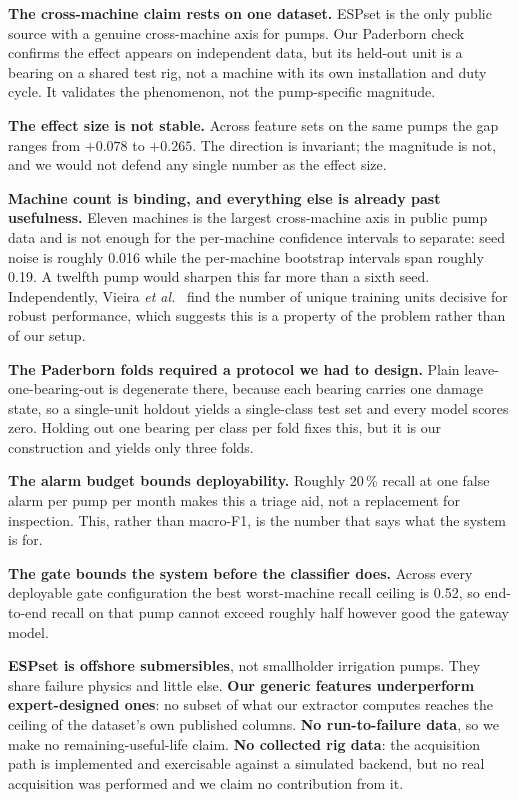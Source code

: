 \documentclass[conference,a4paper,10pt]{IEEEtran}
\begin{document}
\textbf{The cross-machine claim rests on one dataset.} ESPset is the only public
source with a genuine cross-machine axis for pumps. Our Paderborn check confirms
the effect appears on independent data, but its held-out unit is a bearing on a
shared test rig, not a machine with its own installation and duty cycle. It
validates the phenomenon, not the pump-specific magnitude.

\textbf{The effect size is not stable.} Across feature sets on the same pumps the
gap ranges from $+0.078$ to $+0.265$. The direction is invariant; the magnitude is
not, and we would not defend any single number as the effect size.

\textbf{Machine count is binding, and everything else is already past
usefulness.} Eleven machines is the largest cross-machine axis in public pump data
and is not enough for the per-machine confidence intervals to separate: seed noise
is roughly 0.016 while the per-machine bootstrap intervals span roughly 0.19. A
twelfth pump would sharpen this far more than a sixth seed. Independently,
Vieira \emph{et al.}~\cite{vieira2025} find the number of unique training units
decisive for robust performance, which suggests this is a property of the problem
rather than of our setup.

\textbf{The Paderborn folds required a protocol we had to design.} Plain
leave-one-bearing-out is degenerate there, because each bearing carries one damage
state, so a single-unit holdout yields a single-class test set and every model
scores zero. Holding out one bearing per class per fold fixes this, but it is our
construction and yields only three folds.

\textbf{The alarm budget bounds deployability.} Roughly 20\,\% recall at one false
alarm per pump per month makes this a triage aid, not a replacement for
inspection. This, rather than macro-F1, is the number that says what the system is
for.

\textbf{The gate bounds the system before the classifier does.} Across every
deployable gate configuration the best worst-machine recall ceiling is 0.52, so
end-to-end recall on that pump cannot exceed roughly half however good the
gateway model.

\textbf{ESPset is offshore submersibles}, not smallholder irrigation pumps. They
share failure physics and little else. \textbf{Our generic features underperform
expert-designed ones}: no subset of what our extractor computes reaches the
ceiling of the dataset's own published columns. \textbf{No run-to-failure data},
so we make no remaining-useful-life claim. \textbf{No collected rig data}: the
acquisition path is implemented and exercisable against a simulated backend, but
no real acquisition was performed and we claim no contribution from it.
\end{document}
